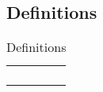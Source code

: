 \subsection{Definitions}
\begin{center}
\renewcommand{\arraystretch}{2}
\begin{longtable}{|m{3cm}|m{7.1cm}|}
\caption{Definitions}\\
\hline
\endfirsthead
\endhead
\hline
\endlastfoot
\hline
& \\
& \\
& \\
& \\
\hline
\end{longtable}
\end{center}